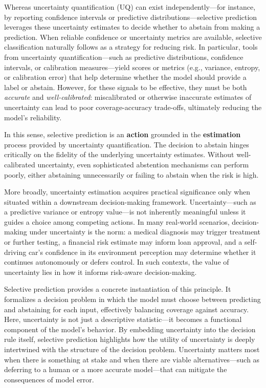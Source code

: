 Whereas uncertainty quantification (UQ) can exist independently—for instance, by reporting confidence intervals or predictive distributions—selective prediction leverages these uncertainty estimates to decide whether to abstain from making a prediction. When reliable confidence or uncertainty metrics are available, selective classification naturally follows as a strategy for reducing risk. In particular, tools from uncertainty quantification—such as predictive distributions, confidence intervals, or calibration measures—yield scores or metrics (e.g., variance, entropy, or calibration error) that help determine whether the model should provide a label or abstain. However, for these signals to be effective, they must be both \emph{accurate} and \emph{well-calibrated}: miscalibrated or otherwise inaccurate estimates of uncertainty can lead to poor coverage-accuracy trade-offs, ultimately reducing the model’s reliability.

In this sense, selective prediction is an \textbf{action} grounded in the \textbf{estimation} process provided by uncertainty quantification. The decision to abstain hinges critically on the fidelity of the underlying uncertainty estimates. Without well-calibrated uncertainty, even sophisticated abstention mechanisms can perform poorly, either abstaining unnecessarily or failing to abstain when the risk is high.

More broadly, uncertainty estimation acquires practical significance only when situated within a downstream decision-making framework. Uncertainty—such as a predictive variance or entropy value—is not inherently meaningful unless it guides a choice among competing actions. In many real-world scenarios, decision-making under uncertainty is the norm: a medical diagnosis may trigger treatment or further testing, a financial risk estimate may inform loan approval, and a self-driving car’s confidence in its environment perception may determine whether it continues autonomously or defers control. In such contexts, the value of uncertainty lies in how it informs risk-aware decision-making.

Selective prediction provides a concrete instantiation of this principle. It formalizes a decision problem in which the model must choose between predicting and abstaining for each input, effectively balancing coverage against accuracy. Here, uncertainty is not just a descriptive statistic—it becomes a functional component of the model’s behavior. By embedding uncertainty into the decision rule itself, selective prediction highlights how the utility of uncertainty is deeply intertwined with the structure of the decision problem. Uncertainty matters most when there is something at stake and when there are viable alternatives—such as deferring to a human or a more accurate model—that can mitigate the consequences of model error.
